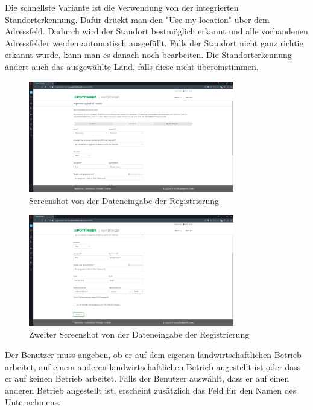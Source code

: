 Die schnellste Variante ist die Verwendung von der integrierten Standorterkennung. Dafür drückt man den "Use my location" über dem Adressfeld. Dadurch wird der Standort bestmöglich erkannt und alle vorhandenen Adressfelder werden automatisch ausgefüllt. Falls der Standort nicht ganz richtig erkannt wurde, kann man es danach noch bearbeiten. Die Standorterkennung ändert auch das ausgewählte Land, falls diese nicht übereinstimmen.
\begin{figure}[H]
	\centerline{
		\includegraphics[width=0.8\textwidth]{./grafiken/erm_register_2.png}
	}
	\vskip0pt
	\caption{Screenshot von der Dateneingabe der Registrierung} \label{fig:register2}
\end{figure}
\begin{figure}[H]
	\centerline{
		\includegraphics[width=0.8\textwidth]{./grafiken/erm_register_3.png}
	}
	\vskip0pt
	\caption{Zweiter Screenshot von der Dateneingabe der Registrierung} \label{fig:register3}
\end{figure}

Der Benutzer muss angeben, ob er auf dem eigenen landwirtschaftlichen Betrieb arbeitet, auf einem anderen landwirtschaftlichen Betrieb angestellt ist oder dass er auf keinen Betrieb arbeitet. Falls der Benutzer auswählt, dass er auf einen anderen Betrieb angestellt ist, erscheint zusätzlich das Feld für den Namen des Unternehmens.\\

